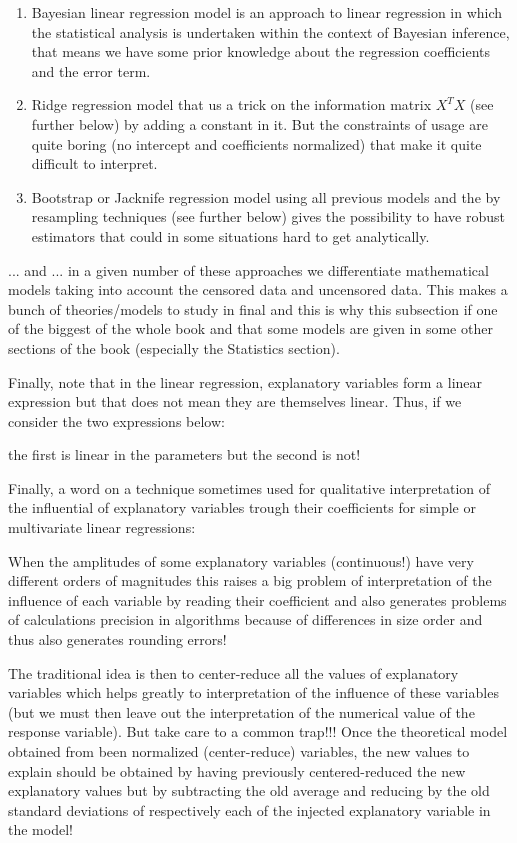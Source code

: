 \begin{enumerate}
		\item Bayesian linear regression model is an approach to linear regression in which the statistical analysis is undertaken within the context of Bayesian inference, that means we have some prior knowledge about the regression coefficients and the error term.
		
		\item Ridge regression model that us a trick on the information matrix $X^TX$ (see further below) by adding a constant in it. But the constraints of usage are quite boring (no intercept and coefficients normalized) that make it quite difficult to interpret.
		
		\item Bootstrap or Jacknife regression model using all previous models and the by resampling techniques (see further below) gives the possibility to have robust estimators that could in some situations hard to get analytically. 
	\end{enumerate}
	... and ... in a given number of these approaches we differentiate mathematical models taking into account the censored data and uncensored data. This makes a bunch of theories/models to study in final and this is why this subsection if one of the biggest of the whole book and that some models are given in some other sections of the book (especially the Statistics section).
	
	Finally, note that in the linear regression, explanatory variables form a linear expression but that does not mean they are themselves linear. Thus, if we consider the two expressions below:
	
	the first is linear in the parameters but the second is not!
	
	Finally, a word on a technique sometimes used for qualitative interpretation of the influential of explanatory variables trough their coefficients for simple or multivariate linear regressions:
	
	When the amplitudes of some explanatory variables (continuous!) have very different orders of magnitudes this raises a big problem of interpretation of the influence of each variable by reading their coefficient and also generates problems of calculations precision in algorithms because of differences in size order and thus also generates rounding errors!
	
	The traditional idea is then to center-reduce all the values of explanatory variables which helps greatly to interpretation of the influence of these variables (but we must then leave out the interpretation of the numerical value of the response variable). But take care to a common trap!!! Once the theoretical model obtained from been normalized (center-reduce) variables, the new values to explain should be obtained by having previously centered-reduced the new explanatory values but by subtracting the old average and reducing by the old standard deviations of respectively each of the injected explanatory variable in the model!
	
